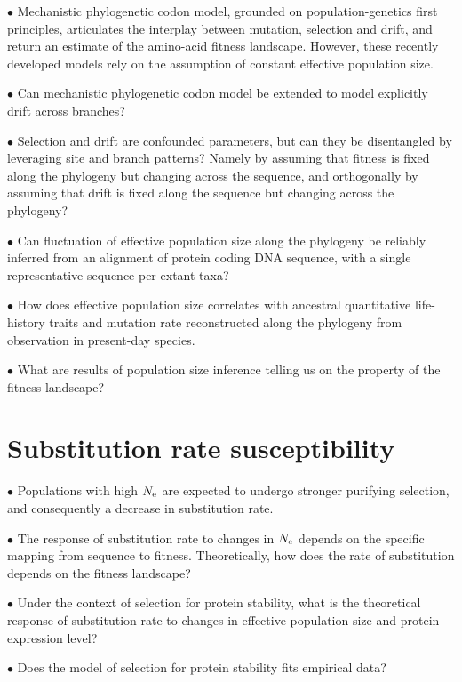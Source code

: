 $\bullet$ Mechanistic phylogenetic codon model, grounded on population-genetics first principles, articulates the interplay between mutation, selection and drift, and return an estimate of the amino-acid fitness landscape.
However, these recently developed models rely on the assumption of constant effective population size.

$\bullet$ Can mechanistic phylogenetic codon model be extended to model explicitly drift across branches?

$\bullet$ Selection and drift are confounded parameters, but can they be disentangled by leveraging site and branch patterns?
Namely by assuming that fitness is fixed along the phylogeny but changing across the sequence, and orthogonally by assuming that drift is fixed along the sequence but changing across the phylogeny?

$\bullet$ Can fluctuation of effective population size along the phylogeny be reliably inferred from an alignment of protein coding DNA sequence, with a single representative sequence per extant taxa?

$\bullet$ How does effective population size correlates with ancestral quantitative life-history traits and mutation rate reconstructed along the phylogeny from observation in present-day species.

$\bullet$ What are results of population size inference telling us on the property of the fitness landscape?

\section{Substitution rate susceptibility}

$\bullet$ Populations with high $N_{\textrm{e}}$ are expected to undergo stronger purifying selection, and consequently a decrease in substitution rate.

$\bullet$ The response of substitution rate to changes in $N_{\textrm{e}}$ depends on the specific mapping from sequence to fitness.
Theoretically, how does the rate of substitution depends on the fitness landscape?

$\bullet$ Under the context of selection for protein stability, what is the theoretical response of substitution rate to changes in effective population size and protein expression level?

$\bullet$ Does the model of selection for protein stability fits empirical data?

